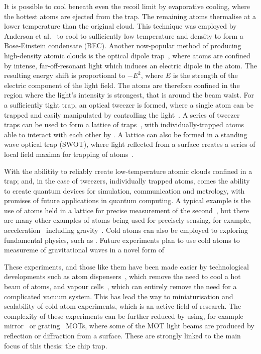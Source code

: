 It is possible to cool beneath even the recoil limit by evaporative cooling,
where the hottest atoms are ejected from the trap. The remaining atoms
thermalise at a lower temperature than the original cloud. This technique was
employed by Anderson et al.~\cite{Anderson198} to cool \esRb{} to sufficiently
low temperature and density to form a Bose-Einstein condensate (BEC). Another
now-popular method of producing high-density atomic clouds is the optical
dipole trap~\cite{Chu1986}, where atoms are confined by intense,
far-off-resonant light which induces an electric dipole in the atom. The
resulting energy shift is proportional to $-E^2$, where $E$ is the strength of
the electric component of the light field. The atoms are therefore confined in
the region where the light's intensity is strongest, that is around the beam
waist. For a sufficiently tight trap, an optical tweezer is formed, where a
single atom can be trapped and easily manipulated by controlling the
light~\cite{Schlosser2001}.  A series of tweezer traps can be used to form a
lattice of traps~\cite{Schlosser2001}, with individually-trapped atoms able to
interact with each other by . A lattice can also be formed
in a standing wave optical trap (SWOT), where light reflected from a surface
creates a series of local field maxima for trapping of atoms~\cite{Wu2017}.

With the abilitity to reliably create low-temperature atomic clouds confined in
a trap; and, in the case of tweezers, individually trapped atoms, comes the
ability to create quantum devices for simulation, communication and metrology,
with promises of future applications in quantum computing. A typical example is
the use of  atoms held in a lattice for precise measurement of the
second~\cite{PhysRevX.8.021036}, but there are many other examples of atoms being used for
precisely sensing, for example, acceleration~\cite{} including gravity~\cite{}.
Cold atoms can also be employed to exploring fundamental physics, such as
. Future experiments plan to use cold atoms to
measureme of gravitational waves in a novel form of 

These experiments, and those like them have been made easier by technological
developments such as atom dispensers~\cite{}, which remove the need to cool
a hot beam of atoms, and vapour cells~\cite{}, which can entirely remove the
need for a complicated vacuum system. This has lead the way to miniaturisation
and scalability of cold atom experiments, which is an active field of research.
The complexity of these experiments can be further reduced by using, for
example mirror~\cite{} or grating~\cite{} MOTs, where some of the MOT light
beams are produced by reflection or diffraction from a surface. These are
strongly linked to the main focus of this thesis: the chip trap.

